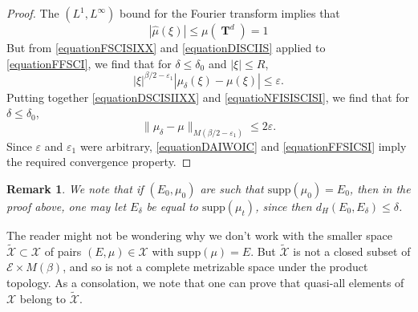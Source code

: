 \documentclass[12pt,reqno]{article}
\numberwithin{equation}{section}
\DeclareMathOperator{\TT}{\mathbf{T}}
\newtheorem{remark}{Remark}
\begin{document}
\begin{proof}
    The $(L^1,L^\infty)$ bound for the Fourier transform implies that
    \begin{equation} \label{equationFSCISIXX}
        |\widehat{\mu}(\xi)| \leq \mu(\TT^d) = 1
    \end{equation}
    But from \eqref{equationFSCISIXX} and \eqref{equationDISCIIS} applied to \eqref{equationFFSCI}, we find that for $\delta \leq \delta_0$ and $|\xi| \leq R$,
    \begin{equation} \label{equatioNFISISCISI}
        |\xi|^{\beta/2 - \varepsilon_1} |\mu_\delta(\xi) - \mu(\xi)| \leq \varepsilon.
    \end{equation}
    Putting together \eqref{equationDSCISIIXX} and \eqref{equatioNFISISCISI}, we find that for $\delta \leq \delta_0$,
    \begin{equation} \label{equationDAIWOIC}
        \| \mu_\delta - \mu \|_{M(\beta/2 - \varepsilon_1)} \leq 2\varepsilon.
    \end{equation}
    Since $\varepsilon$ and $\varepsilon_1$ were arbitrary, \eqref{equationDAIWOIC} and \eqref{equationFFSICSI} imply the required convergence property.
\end{proof}

\begin{remark} \label{remarkDOIWJDIOWJ2}
    We note that if $(E_0,\mu_0)$ are such that $\text{supp}(\mu_0) = E_0$, then in the proof above, one may let $E_\delta$ be equal to $\text{supp}(\mu_t)$, since then $d_H(E_0,E_\delta) \leq \delta$.
\end{remark}

The reader might not be wondering why we don't work with the smaller space $\tilde{\mathcal{X}} \subset \mathcal{X}$ of pairs $(E,\mu) \in \mathcal{X}$ with $\text{supp}(\mu) = E$. But $\tilde{\mathcal{X}}$ is not a closed subset of $\mathcal{E} \times M(\beta)$, and so is not a complete metrizable space under the product topology. As a consolation, we note that one can prove that quasi-all elements of $\mathcal{X}$ belong to $\tilde{\mathcal{X}}$.
\end{document}
